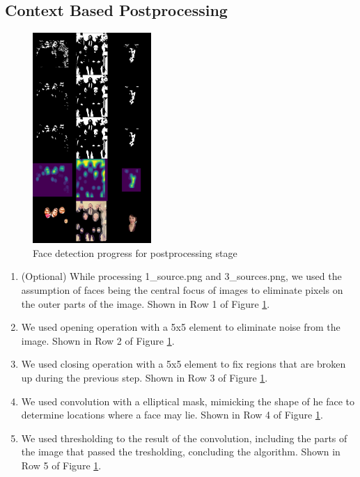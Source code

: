 \documentclass[conference]{IEEEtran}
\begin{document}
\subsection{Context Based Postprocessing}
\begin{figure}[h]
    \centering
    \includegraphics[width=0.4\textwidth]{resources/Progress 2.jpeg}
    \caption{Face detection progress for postprocessing stage}
    \label{fig:pro2}
\end{figure}
\begin{enumerate}
	\item \label{step:C1} (Optional) While processing 1\_source.png and 3\_sources.png, we used the assumption of faces being the central focus of images to eliminate pixels on the outer parts of the image. Shown in Row 1 of Figure \ref{fig:pro2}.
	\item \label{step:C2} We used opening operation with a 5x5 element to eliminate noise from the image. Shown in Row 2 of Figure \ref{fig:pro2}.
	\item \label{step:C3} We used closing operation with a 5x5 element to fix regions that are broken up during the previous step. Shown in Row 3 of Figure \ref{fig:pro2}.
	\item \label{step:C4} We used convolution with a elliptical mask, mimicking the shape of he face to determine locations where a face may lie. Shown in Row 4 of Figure \ref{fig:pro2}.
	\item \label{step:C5} We used thresholding to the result of the convolution, including the parts of the image that passed the tresholding, concluding the algorithm. Shown in Row 5 of Figure \ref{fig:pro2}.
\end{enumerate}
\end{document}
